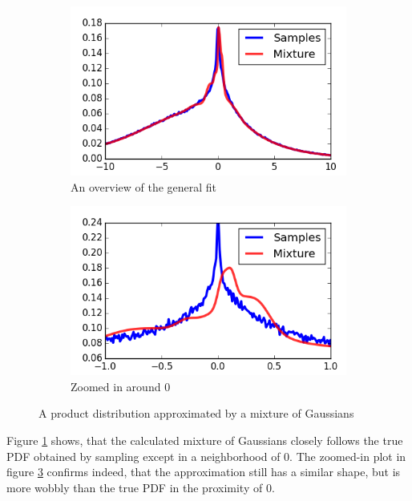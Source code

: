 \documentclass[11pt,a4paper]{book}
\begin{document}
\begin{figure}[h]
  \centering
  \begin{subfigure}{0.45\textwidth}
    \centering
    \includegraphics[width=\textwidth]{thesis/theory/gauss-hermite}
    \caption{An overview of the general fit}
    \label{fig:gauss-laguerre}
  \end{subfigure}
  \hfill
  \begin{subfigure}{0.45\textwidth}
    \centering
    \includegraphics[width=\textwidth]{thesis/theory/gauss-hermite-zoomed}
    \caption{Zoomed in around $0$}
    \label{fig:gauss-laguerre-zoomed}
  \end{subfigure}
  \caption{A product distribution approximated by a mixture of Gaussians}
\end{figure}
Figure \ref{fig:gauss-laguerre} shows, that the calculated mixture of Gaussians
closely follows the true PDF obtained by sampling except in a neighborhood of
$0$. The zoomed-in plot in figure \ref{fig:gauss-laguerre-zoomed} confirms
indeed, that the approximation still has a similar shape, but is more wobbly
than the true PDF in the proximity of $0$.
\end{document}
